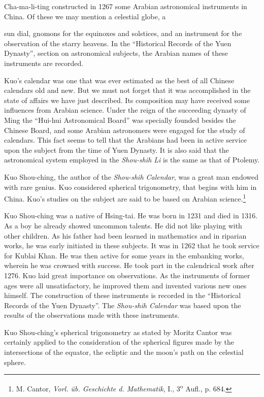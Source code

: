 \documentclass[11pt]{article}
\newcommand{\scanpage}[2]{\clearpage\setcounter{footnote}{0}\noindent{\footnotesize\color{gray}PDF page #1 · #2}\par\medskip}
\newcommand{\scanfooter}{}
\begin{document}
Cha-ma-li-ting constructed in 1267 some Arabian astronomical instruments in China. Of these we may mention a celestial globe, a
\scanfooter

\scanpage{0115}{Chapter 15, printed page 101}
\setcounter{footnote}{0}
sun dial, gnomons for the equinoxes and solstices, and an instrument for the observation of the starry heavens. In the ``Historical Records of the Yuen Dynasty'', section on astronomical subjects, the Arabian names of these instruments are recorded.

Kuo's calendar was one that was ever estimated as the best of all Chinese calendars old and new. But we must not forget that it was accomplished in the state of affairs we have just described. Its composition may have received some influences from Arabian science. Under the reign of the succeeding dynasty of Ming the ``Hui-hui Astronomical Board'' was specially founded besides the Chinese Board, and some Arabian astronomers were engaged for the study of calendars. This fact seems to tell that the Arabians had been in active service upon the subject from the time of Yuen Dynasty. It is also said that the astronomical system employed in the \emph{Shou-shih Li} is the same as that of Ptolemy.

Kuo Shou-ching, the author of the \emph{Shou-shih Calendar}, was a great man endowed with rare genius. Kuo considered spherical trigonometry, that begins with him in China. Kuo's studies on the subject are said to be based on Arabian science.\footnote{M. Cantor, \emph{Vorl. üb. Geschichte d. Mathematik}, I., 3\textsuperscript{o} Aufl., p. 684.}

Kuo Shou-ching was a native of Hsing-tai. He was born in 1231 and died in 1316. As a boy he already showed uncommon talents. He did not like playing with other children. As his father had been learned in mathematics and in riparian works, he was early initiated in these subjects. It was in 1262 that he took service for Kublai Khan. He was then active for some years in the embanking works, wherein he was crowned with success. He took part in the calendrical work after 1276. Kuo laid great importance on observations. As the instruments of former ages were all unsatisfactory, he improved them and invented various new ones himself. The construction of these instruments is recorded in the ``Historical Records of the Yuen Dynasty''. The \emph{Shou-shih Calendar} was based upon the results of the observations made with these instruments.

Kuo Shou-ching's spherical trigonometry as stated by Moritz Cantor was certainly applied to the consideration of the spherical figures made by the intersections of the equator, the ecliptic and the moon's path on the celestial sphere.
\end{document}
